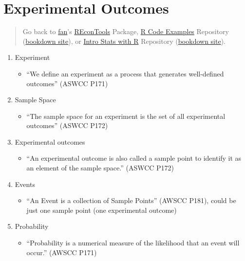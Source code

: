 \documentclass[
]{book}
\providecommand{\tightlist}{%
  \setlength{\itemsep}{0pt}\setlength{\parskip}{0pt}}
\begin{document}
\hypertarget{experimental-outcomes}{%
\section{Experimental Outcomes}\label{experimental-outcomes}}

\begin{quote}
Go back to \href{http://fanwangecon.github.io/}{fan}'s \href{https://fanwangecon.github.io/REconTools/}{REconTools} Package, \href{https://fanwangecon.github.io/R4Econ/}{R Code Examples} Repository (\href{https://fanwangecon.github.io/R4Econ/bookdown}{bookdown site}), or \href{https://fanwangecon.github.io/Stat4Econ/}{Intro Stats with R} Repository (\href{https://fanwangecon.github.io/Stat4Econ/bookdown}{bookdown site}).
\end{quote}

\begin{enumerate}
\def\labelenumi{\arabic{enumi}.}
\tightlist
\item
  Experiment

  \begin{itemize}
  \tightlist
  \item
    ``We define an experiment as a process that generates well-defined outcomes'' (ASWCC P171)
  \end{itemize}
\item
  Sample Space

  \begin{itemize}
  \tightlist
  \item
    ``The sample space for an experiment is the set of all experimental outcomes'' (ASWCC P172)
  \end{itemize}
\item
  Experimental outcomes

  \begin{itemize}
  \tightlist
  \item
    ``An experimental outcome is also called a sample point to identify it as an element of the sample space.'' (ASWCC P172)
  \end{itemize}
\item
  Events

  \begin{itemize}
  \tightlist
  \item
    ``An Event is a collection of Sample Points'' (AWSCC P181), could be just one sample point (one experimental outcome)
  \end{itemize}
\item
  Probability

  \begin{itemize}
  \tightlist
  \item
    ``Probability is a numerical measure of the likelihood that an event will occur.'' (AWSCC P171)
  \end{itemize}
\end{enumerate}
\end{document}
